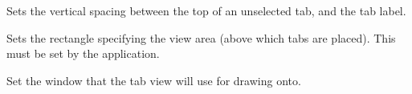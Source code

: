 
Sets the vertical spacing between the top of an unselected tab, and the tab label.

\label{wxtabviewsetviewrect}


Sets the rectangle specifying the view area (above which tabs are
placed). This must be set by the application. 



Set the window that the tab view will use for drawing onto.

